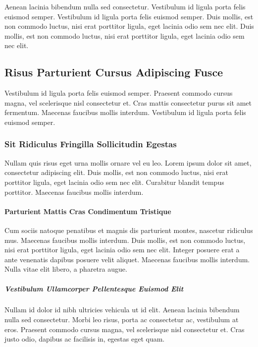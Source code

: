 \documentclass[a4paper,11pt]{article}
\begin{document}
Aenean lacinia bibendum nulla sed consectetur. Vestibulum id ligula porta felis euismod semper. Vestibulum id ligula porta felis euismod semper. Duis mollis, est non commodo luctus, nisi erat porttitor ligula, eget lacinia odio sem nec elit. Duis mollis, est non commodo luctus, nisi erat porttitor ligula, eget lacinia odio sem nec elit.

\subsection{Risus Parturient Cursus Adipiscing Fusce}

Vestibulum id ligula porta felis euismod semper. Praesent commodo cursus magna, vel scelerisque nisl consectetur et. Cras mattis consectetur purus sit amet fermentum. Maecenas faucibus mollis interdum. Vestibulum id ligula porta felis euismod semper.

\subsubsection{Sit Ridiculus Fringilla Sollicitudin Egestas}

Nullam quis risus eget urna mollis ornare vel eu leo. Lorem ipsum dolor sit amet, consectetur adipiscing elit. Duis mollis, est non commodo luctus, nisi erat porttitor ligula, eget lacinia odio sem nec elit. Curabitur blandit tempus porttitor. Maecenas faucibus mollis interdum.

\paragraph{Parturient Mattis Cras Condimentum Tristique}

Cum sociis natoque penatibus et magnis dis parturient montes, nascetur ridiculus mus. Maecenas faucibus mollis interdum. Duis mollis, est non commodo luctus, nisi erat porttitor ligula, eget lacinia odio sem nec elit. Integer posuere erat a ante venenatis dapibus posuere velit aliquet. Maecenas faucibus mollis interdum. Nulla vitae elit libero, a pharetra augue.

\subparagraph{Vestibulum Ullamcorper Pellentesque Euismod Elit}

Nullam id dolor id nibh ultricies vehicula ut id elit. Aenean lacinia bibendum nulla sed consectetur. Morbi leo risus, porta ac consectetur ac, vestibulum at eros. Praesent commodo cursus magna, vel scelerisque nisl consectetur et. Cras justo odio, dapibus ac facilisis in, egestas eget quam.
\end{document}
